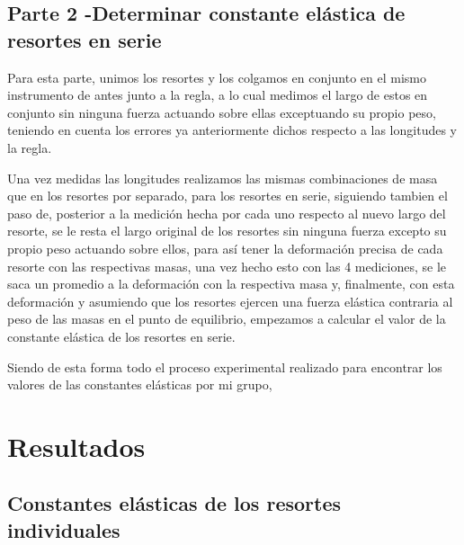 \documentclass[12pt,a4paper]{article}
\begin{document}
\subsection{Parte 2 -Determinar constante elástica de resortes en serie} \label{Procedimiento-Parte-2}

Para esta parte, unimos los resortes y los colgamos en conjunto en el mismo instrumento de antes junto a la regla, a lo cual medimos el largo de estos en conjunto sin ninguna fuerza actuando sobre ellas exceptuando su propio peso, teniendo en cuenta los errores ya anteriormente dichos respecto a las longitudes y la regla.

Una vez medidas las longitudes realizamos las mismas combinaciones de masa que en los resortes por separado, para los resortes en serie, siguiendo tambien el paso de, posterior a la medición hecha por cada uno respecto al nuevo largo del resorte, se le resta el largo original de los resortes sin ninguna fuerza excepto su propio peso actuando sobre ellos, para así tener la deformación precisa de cada resorte con las respectivas masas, una vez hecho esto con las 4 mediciones, se le saca un promedio a la deformación con la respectiva masa y, finalmente, con esta deformación y asumiendo que los resortes ejercen una fuerza elástica contraria al peso de las masas en el punto de equilibrio, empezamos a calcular el valor de la constante elástica de los resortes en serie.

Siendo de esta forma todo el proceso experimental realizado para encontrar los valores de las constantes elásticas por mi grupo, 


\section{Resultados}

\subsection{Constantes elásticas de los resortes individuales}
\end{document}

